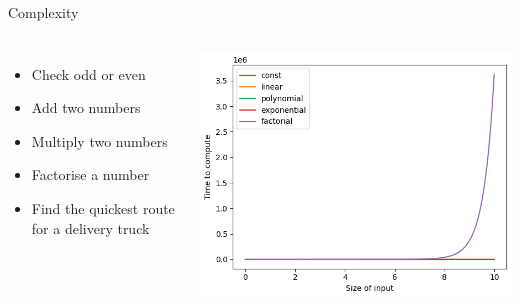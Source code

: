 \documentclass{beamer}
\begin{document}
\begin{frame}{Complexity}
    \begin{columns}
    \begin{itemize}
        \item Check odd or even \\
        \item Add two numbers \\
        \item Multiply two numbers \\
        \item Factorise a number \\
        \item Find the quickest route for a delivery truck
    \end{itemize}
    \includegraphics[width=\columnwidth]{images/complex4.png}
    \end{columns}
\end{frame}
\end{document}
